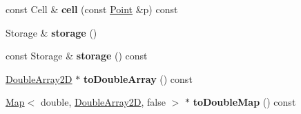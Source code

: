 \begin{DoxyCompactItemize}
\item 
\mbox{\label{classGMapping_1_1Map_ac25cc844ef6af3a71deb8d2eed2374f1}} 
const Cell \& {\bfseries cell} (const \hyperlink{structGMapping_1_1point}{Point} \&p) const
\item 
\mbox{\label{classGMapping_1_1Map_a8bc733ffc30a93d5ccc2d50fde1b0bcb}} 
Storage \& {\bfseries storage} ()
\item 
\mbox{\label{classGMapping_1_1Map_af416137d12cbb60575cda0114e64827b}} 
const Storage \& {\bfseries storage} () const
\item 
\mbox{\label{classGMapping_1_1Map_aec32de1d6f2bf3c4c65e8b0061d70114}} 
\hyperlink{classGMapping_1_1Array2D}{Double\+Array2D} $\ast$ {\bfseries to\+Double\+Array} () const
\item 
\mbox{\label{classGMapping_1_1Map_a951c00310fe6138f46e29af17ff2dd64}} 
\hyperlink{classGMapping_1_1Map}{Map}$<$ double, \hyperlink{classGMapping_1_1Array2D}{Double\+Array2D}, false $>$ $\ast$ {\bfseries to\+Double\+Map} () const
\end{DoxyCompactItemize}
